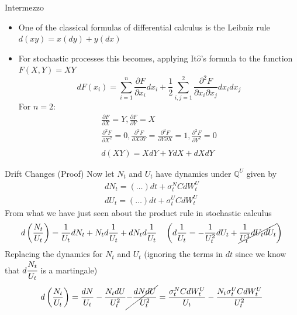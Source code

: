 \documentclass{beamer}
\begin{document}
\begin{frame}{Intermezzo}
  \begin{itemize}
  \item One of the classical formulas of differential calculus is the Leibniz rule $d(x y) = x(dy) + y(dx)$
  \item For stochastic processes this becomes, applying It$\hat{o}$'s formula to the function $F(X,Y) = XY$
    \begin{equation*}
      dF(x_i)=\sum_{i=1}^n \frac{\partial F}{\partial x_i}dx_i
      +\frac{1}{2}\sum_{i,j=1}^2 \frac{\partial^2 F}{\partial x_i \partial x_j}dx_i dx_j
    \end{equation*}
  For $n=2$:
    \begin{equation*}
      \begin{gathered}
        \frac{\partial F}{\partial X}=Y,\frac{\partial F}{\partial Y}=X \\
        \frac{\partial^2 F}{\partial X^2}=0,\frac{\partial^2 F}{\partial X\partial Y}=\frac{\partial^2 F}{\partial Y\partial X}=1,\frac{\partial^2 F}{\partial Y^2}=0\\
        \\
        d(XY) = XdY + YdX + dXdY
      \end{gathered}
    \end{equation*}
  \end{itemize}
\end{frame}

\begin{frame}{Drift Changes (Proof)}	
Now let $N_t$ and $U_t$ have dynamics under $\mathbb{Q}^U$ given by 
\begin{equation*}
	\begin{gathered}
		dN_t = (\ldots) dt + \sigma_t^NCdW^U_t\\
		dU_t = (\ldots) dt + \sigma_t^UCdW^U_t 
	\end{gathered}
\end{equation*}
	\pause
        From what we have just seen about the product rule in stochastic calculus
        \begin{equation*}
          \begin{gathered}
            d\left(\frac{N_t}{U_t}\right)=\frac{1}{U_t}dN_t+N_td\frac{1}{U_t}+dN_td\frac{1}{U_t} \quad \left(d\frac{1}{U_t}=-\frac{1}{U^2_t}dU_t+\cancel{\frac{1}{U^3_t}dU_tdU_t}\right) \\
          \end{gathered}
  \end{equation*}
	\pause
  Replacing the dynamics for $N_t$ and $U_t$ (ignoring the terms in $dt$ since we know that $d\cfrac{N_t}{U_t}$ is a martingale)
  \begin{equation}
    d\left(\frac{N_t}{U_t}\right) = \frac{dN}{U_t}-\frac{N_tdU}{U^2_t}\cancel{-\frac{dNdU}{U_t^2}}=\frac{\sigma^N_t CdW^U_t}{U_t} - \frac{N_t\sigma^U_t C dW^U_t}{U^2_t}
    \label{eq:dnu}
  \end{equation}
\end{frame}
\end{document}
